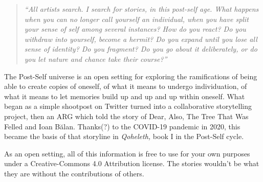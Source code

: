 \begin{quote}
\emph{``All artists search. I search for stories, in this post-self age. What happens when you can no longer call yourself an individual, when you have split your sense of self among several instances? How do you react? Do you withdraw into yourself, become a hermit? Do you expand until you lose all sense of identity? Do you fragment? Do you go about it deliberately, or do you let nature and chance take their course?''}
\end{quote}

\noindent The Post-Self universe is an open setting for exploring the ramifications of being able to create copies of oneself, of what it means to undergo individuation, of what it means to let memories build up and up and up within oneself. What began as a simple shootpost on Twitter turned into a collaborative storytelling project, then an ARG which told the story of Dear, Also, The Tree That Was Felled and Ioan Bălan. Thanks(?) to the COVID-19 pandemic in 2020, this became the basis of that storyline in \emph{Qoheleth,} book I in the Post-Self cycle.

As an open setting, all of this information is free to use for your own purposes under a Creative-Commons 4.0 Attribution license. The stories wouldn't be what they are without the contributions of others.
